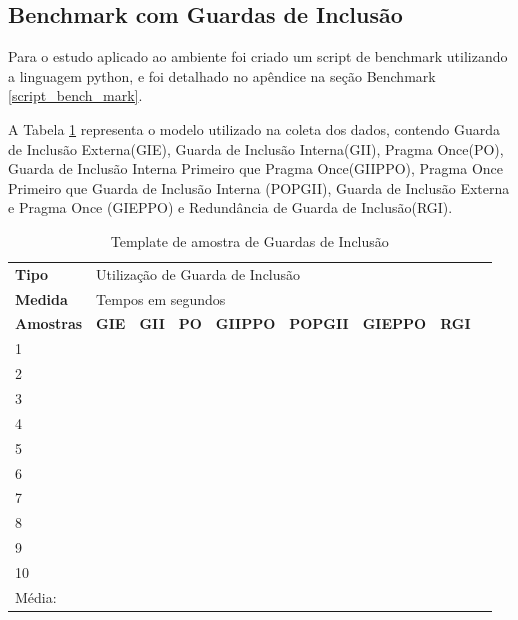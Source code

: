 \subsection{Benchmark com Guardas de Inclusão}\label{Amplicação ao Ambiente}

Para o estudo aplicado ao ambiente foi criado um script de benchmark utilizando
 a linguagem python, e foi detalhado no apêndice na seção Benchmark \ref{script_bench_mark}.

A Tabela \ref{tab:modelo_guards} representa o modelo utilizado na coleta dos dados,
 contendo Guarda de Inclusão Externa(GIE), Guarda de Inclusão Interna(GII),
 Pragma Once(PO), Guarda de Inclusão Interna Primeiro que Pragma Once(GIIPPO),
 Pragma Once Primeiro que Guarda de Inclusão Interna (POPGII),
 Guarda de Inclusão Externa e Pragma Once (GIEPPO) e
 Redundância de Guarda de Inclusão(RGI).

\begin{table}[!ht]
\centering
\caption{Template de amostra de Guardas de Inclusão}
\label{tab:modelo_guards}
\begin{tiny}
\begin{tabular}{lp{1cm}p{1cm}p{1cm}p{1cm}p{1cm}p{1cm}p{1cm}p{1cm}}
\textbf{Tipo} & \multicolumn{7}{l}{Utilização de Guarda de Inclusão} \\
\textbf{Medida} & \multicolumn{7}{l}{Tempos em segundos } \\
\textbf{Amostras} & \textbf{GIE} & \textbf{GII} & \textbf{PO} & 
\textbf{GIIPPO} & \textbf{POPGII} & \textbf{GIEPPO} & \textbf{RGI} \\ \toprule
 1  &  &  &   &   &   &   &  \\ 
 2  &  &  &   &   &   &   &  \\ 
 3  &  &  &   &   &   &   &  \\ 
 4  &  &  &   &   &   &   &  \\ 
 5  &  &  &   &   &   &   &  \\ 
 6  &  &  &   &   &   &   &  \\ 
 7  &  &  &   &   &   &   &  \\ 
 8  &  &  &   &   &   &   &  \\ 
 9  &  &  &   &   &   &   &  \\ 
 10 &  &  &   &   &   &   &  \\ \bottomrule
 Média: & & & & &   &   &    \\ 
\end{tabular}
\end{tiny}
\end{table}

